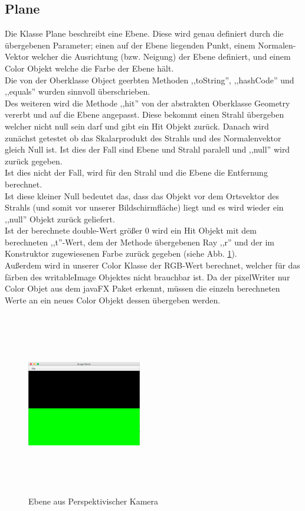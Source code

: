 \documentclass[14pt]{extarticle}
\begin{document}
\subsection{Plane}
Die Klasse Plane beschreibt eine Ebene. Diese wird genau definiert durch die übergebenen Parameter; einen auf der Ebene liegenden Punkt, einem Normalen-Vektor welcher die Ausrichtung (bzw. Neigung) der Ebene definiert, und einem Color Objekt welche die Farbe der Ebene hält. \\
Die von der Oberklasse Object geerbten Methoden ,,toString'', ,,hashCode'' und ,,equals'' wurden sinnvoll überschrieben.\\
Des weiteren wird die Methode ,,hit'' von der abstrakten Oberklasse Geometry vererbt und auf die Ebene angepasst. Diese bekommt einen Strahl übergeben welcher nicht null sein darf und gibt ein Hit Objekt zurück. Danach wird zunächst getestet ob das Skalarprodukt des Strahls und des Normalenvektor gleich Null ist. Ist dies der Fall sind Ebene und Strahl paralell und ,,null'' wird zurück gegeben. \\
Ist dies nicht der Fall, wird für den Strahl und die Ebene die Entfernung berechnet. \\
Ist diese kleiner Null bedeutet das, dass das Objekt vor dem Ortsvektor des Strahls (und somit vor unserer Bildschirmfläche) liegt und es wird wieder ein ,,null'' Objekt zurück geliefert. \\
Ist der berechnete double-Wert größer 0 wird ein Hit Objekt mit dem berechneten ,,t''-Wert, dem der Methode übergebenen Ray ,,r'' und der im Konstruktor zugewiesenen Farbe zurück gegeben (siehe Abb. \ref{Ebene}).\\
Außerdem wird in unserer Color Klasse der RGB-Wert berechnet, welcher für das färben des writableImage Objektes nicht brauchbar ist. Da der pixelWriter nur Color Objet aus dem javaFX Paket erkennt, müssen die einzeln berechneten Werte an ein neues Color Objekt dessen übergeben werden.
\begin{figure}[ht]
\begin{center}
\includegraphics[width=5cm, height=8cm]{TestCase1.png}
\caption{Ebene aus Perspektivischer Kamera}
\label{Ebene}
\end{center}
\end{figure}
\end{document}
